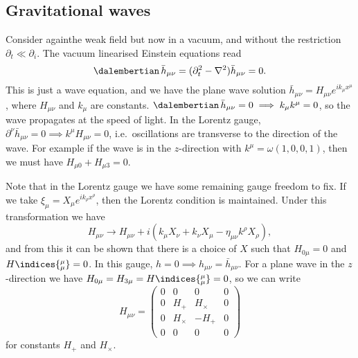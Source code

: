 \documentclass{jknotes}
\begin{document}
\subsection{Gravitational waves}

Consider againthe weak field but now in a vacuum, and without the restriction \(\partial_t \ll \partial_i\). The vacuum linearised Einstein equations read
\begin{equation}
    \dalembertian\,\bar{h}_{\mu\nu} = (\partial_t^2 - \nabla^2)\bar{h}_{\mu\nu} = 0.
\end{equation}
This is just a wave equation, and we have the plane wave solution \(\bar{h}_{\mu\nu} = H_{\mu\nu}e^{ik_\mu x^\mu}\), where \(H_{\mu\nu}\) and \(k_\mu\) are constants. \(\dalembertian\,\bar{h}_{\mu\nu} = 0 \implies k_\mu k^\mu = 0\), so the wave propagates at the speed of light. In the Lorentz gauge, \(\partial^\nu\bar{h}_{\mu\nu} = 0 \implies k^\mu H_{\mu\nu} = 0\), i.e.\ oscillations are transverse to the direction of the wave. For example if the wave is in the \(z\)-direction with \(k^\mu = \omega(1,0,0,1)\), then we must have \(H_{\mu0} + H_{\mu3} = 0\).

Note that in the Lorentz gauge we have some remaining gauge freedom to fix. If we take \(\xi_\mu = X_\mu e^{ik_\rho x^\rho}\), then the Lorentz condition is maintained. Under this transformation we have
\begin{equation}
    H_{\mu\nu} \to H_{\mu\nu} + i(k_\mu X_\nu + k_\nu X_\mu - \eta_{\mu\nu} k^\rho X_\rho),
\end{equation}
and from this it can be shown that there is a choice of \(X\) such that \(H_{0\mu} = 0\) and \(H\indices{^\mu_\mu} = 0\). In this gauge, \(h = 0 \implies h_{\mu\nu} = \bar{h}_{\mu\nu}\). For a plane wave in the \(z\)-direction we have \(H_{0\mu} = H_{3\mu} = H\indices{^\mu_\mu} = 0\), so we can write
\begin{equation}
    H_{\mu\nu} = 
    \begin{pmatrix}
        0 & 0 & 0 & 0 \\
        0 & H_+ & H_\times & 0 \\
        0 & H_\times & - H_+ & 0 \\
        0 & 0 & 0 & 0
    \end{pmatrix}
\end{equation}
for constants \(H_+\) and \(H_\times\).
\end{document}
